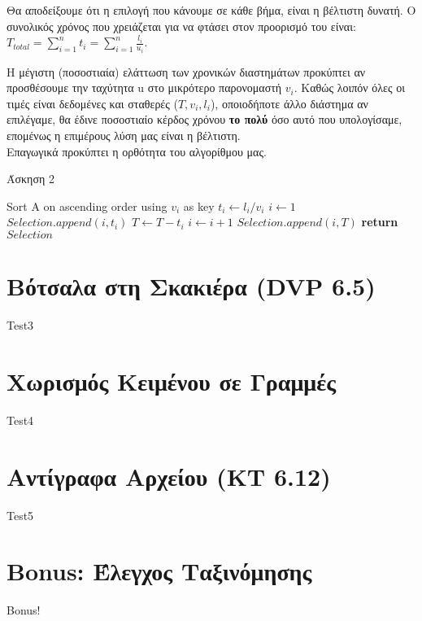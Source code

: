 \documentclass[a4paper,11pt]{article}
\begin{document}
Θα αποδείξουμε ότι η επιλογή που κάνουμε σε κάθε βήμα, είναι η βέλτιστη
δυνατή.
Ο συνολικός χρόνος που χρειάζεται για να φτάσει στον προορισμό του είναι: \\
$T_{total}=\displaystyle\sum\limits_{i=1}^n{t_i} =
\displaystyle\sum\limits_{i=1}^n{\frac{l_i}{u_i}}$.

Η μέγιστη (ποσοστιαία) ελάττωση των χρονικών διαστημάτων προκύπτει αν
προσθέσουμε την ταχύτητα u στο μικρότερο παρονομαστή $v_i$. Kαθώς λοιπόν
όλες οι τιμές είναι δεδομένες και σταθερές ($T, v_i, l_i$), οποιοδήποτε άλλο
διάστημα αν επιλέγαμε, θα έδινε ποσοστιαίο κέρδος χρόνου \textbf{το πολύ} όσο αυτό
που υπολογίσαμε, επομένως η επιμέρους λύση μας είναι η βέλτιστη.\\
Επαγωγικά προκύπτει η ορθότητα του αλγορίθμου μας.

\begin{algorithm}[H]
\caption{Άσκηση 2}
\begin{algorithmic}[1]
    \State Sort A on ascending order using $v_i$ as key
	\State $t_i \gets l_i / v_i$
    \EndFor
{}
    \State $i \gets 1$
	\State $Selection.append (i,t_i)$
	\State $T \gets T - t_i$
        \State $i \gets i+1$
    \EndWhile
    \State $Selection.append (i, T)$
    \State \textbf{return} $Selection$
\EndProcedure
\end{algorithmic}
\end{algorithm}




\section{Βότσαλα στη Σκακιέρα (DVP 6.5)}
Test3


\section{Χωρισμός Κειμένου σε Γραμμές}
Test4


\section{Αντίγραφα Αρχείου (KT 6.12)}
Test5


\section{Bonus: Έλεγχος Ταξινόμησης}
Bonus!
\end{document}

